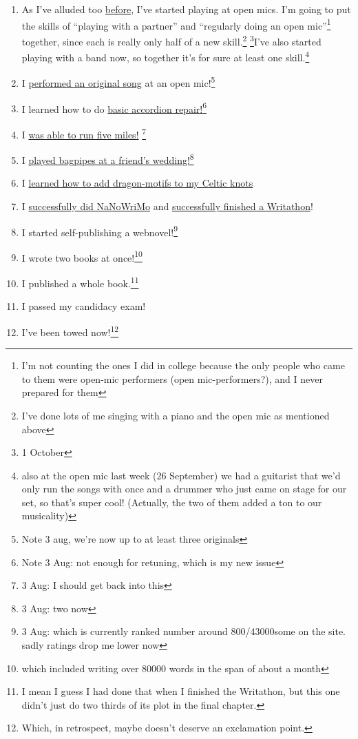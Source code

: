 \documentclass[12pt]{article}[titlepage]
\newcommand{\say}[1]{``#1''}
\newcommand{\1}{\={a}}
\newcommand{\2}{\={e}}
\newcommand{\3}{\={\i}}
\newcommand{\4}{\=o}
\newcommand{\5}{\=u}
\newcommand{\6}{\={A}}
\renewcommand{\,}{\textsuperscript{,}}
\begin{document}
\begin{enumerate}
\item As I've alluded too \href{open-mic-2.html}{before}, I've started playing at open mics.
I'm going to put the skills of \say{playing with a partner} and \say{regularly doing an open mic}\footnote{I'm not counting the ones I did in college because the only people who came to them were open-mic performers (open mic-performers?), and I never prepared for them} together, since each is really only half of a new skill.\footnote{I've done lots of me singing with a piano and the open mic as mentioned above} \footnote{1 October}I've also started playing with a band now, so together it's for sure at least one skill.\footnote{also at the open mic last week (26 September) we had a guitarist that we'd only run the songs with once and a drummer who just came on stage for our set, so that's super cool! (Actually, the two of them added a ton to our musicality)}
\item I \href{performing-a-song.html}{performed an original song} at an open mic!\footnote{Note 3 aug, we're now up to at least three originals}
\item I learned how to do \href{accordion-repair.html}{basic accordion repair!}\footnote{Note 3 Aug: not enough for retuning, which is my new issue}
\item I \href{running-2.html}{was able to run five miles!} \footnote{3 Aug: I should get back into this}
\item I \href{bagpipes.html}{played bagpipes at a friend's wedding!}\footnote{3 Aug: two now}
\item I \href{celtic-knots.html}{learned how to add dragon-motifs to my Celtic knots}
\item I \href{nanowrimo-4.html}{successfully did NaNoWriMo} and \href{writathon-23-april.html}{successfully finished a Writathon}!
\item I started self-publishing a webnovel!\footnote{3 Aug: which is currently ranked number around 800/43000some on the site. sadly ratings drop me lower now}
\item I wrote two books at once!\footnote{which included writing over 80000 words in the span of about a month}
\item I published a whole book.\footnote{I mean I guess I had done that when I finished the Writathon, but this one didn't just do two thirds of its plot in the final chapter.}
\item I passed my candidacy exam!
\item I've been towed now!\footnote{Which, in retrospect, maybe doesn't deserve an exclamation point.}

\end{enumerate}
\end{document}
